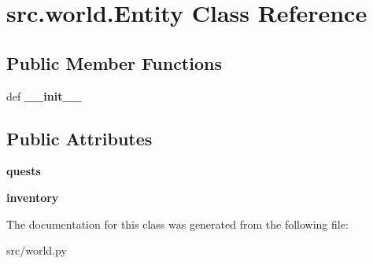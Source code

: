 \hypertarget{classsrc_1_1world_1_1_entity}{\section{src.\-world.\-Entity \-Class \-Reference}
\label{classsrc_1_1world_1_1_entity}
}
\subsection*{\-Public \-Member \-Functions}
\begin{DoxyCompactItemize}
\item 
\hypertarget{classsrc_1_1world_1_1_entity_a4a2c20fa15aa06f416b783bdd8969a70}{def {\bfseries \-\_\-\-\_\-init\-\_\-\-\_\-}}\label{classsrc_1_1world_1_1_entity_a4a2c20fa15aa06f416b783bdd8969a70}

\end{DoxyCompactItemize}
\subsection*{\-Public \-Attributes}
\begin{DoxyCompactItemize}
\item 
\hypertarget{classsrc_1_1world_1_1_entity_aa2aed1efbc5157f11890fe04f45980b5}{{\bfseries quests}}\label{classsrc_1_1world_1_1_entity_aa2aed1efbc5157f11890fe04f45980b5}

\item 
\hypertarget{classsrc_1_1world_1_1_entity_a22798645d6cc02ddb409797677f51f5f}{{\bfseries inventory}}\label{classsrc_1_1world_1_1_entity_a22798645d6cc02ddb409797677f51f5f}

\end{DoxyCompactItemize}


\-The documentation for this class was generated from the following file\-:\begin{DoxyCompactItemize}
\item 
src/world.\-py\end{DoxyCompactItemize}
